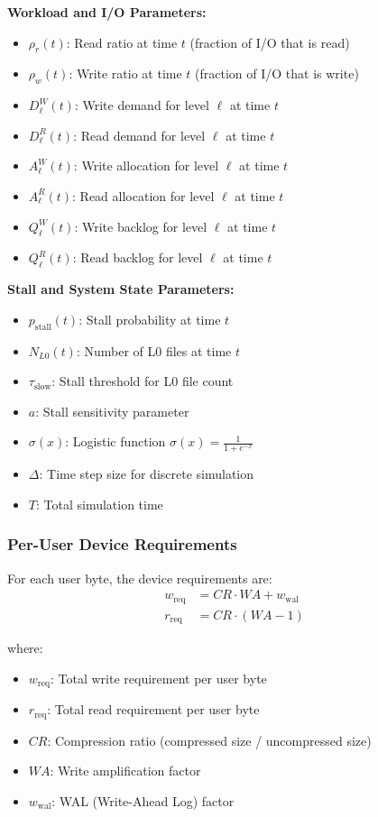 \documentclass[11pt]{article}
\begin{document}
\textbf{Workload and I/O Parameters:}
\begin{itemize}
    \item $\rho_r(t)$: Read ratio at time $t$ (fraction of I/O that is read)
    \item $\rho_w(t)$: Write ratio at time $t$ (fraction of I/O that is write)
    \item $D^W_\ell(t)$: Write demand for level $\ell$ at time $t$
    \item $D^R_\ell(t)$: Read demand for level $\ell$ at time $t$
    \item $A^W_\ell(t)$: Write allocation for level $\ell$ at time $t$
    \item $A^R_\ell(t)$: Read allocation for level $\ell$ at time $t$
    \item $Q^W_\ell(t)$: Write backlog for level $\ell$ at time $t$
    \item $Q^R_\ell(t)$: Read backlog for level $\ell$ at time $t$
\end{itemize}

\textbf{Stall and System State Parameters:}
\begin{itemize}
    \item $p_{\text{stall}}(t)$: Stall probability at time $t$
    \item $N_{L0}(t)$: Number of L0 files at time $t$
    \item $\tau_{\text{slow}}$: Stall threshold for L0 file count
    \item $a$: Stall sensitivity parameter
    \item $\sigma(x)$: Logistic function $\sigma(x) = \frac{1}{1 + e^{-x}}$
    \item $\Delta$: Time step size for discrete simulation
    \item $T$: Total simulation time
\end{itemize}

\subsubsection{Per-User Device Requirements}
For each user byte, the device requirements are:
\begin{align}
w_{\text{req}} &= CR \cdot WA + w_{\text{wal}} \\
r_{\text{req}} &= CR \cdot (WA - 1)
\end{align}

where:
\begin{itemize}
    \item $w_{\text{req}}$: Total write requirement per user byte
    \item $r_{\text{req}}$: Total read requirement per user byte
    \item $CR$: Compression ratio (compressed size / uncompressed size)
    \item $WA$: Write amplification factor
    \item $w_{\text{wal}}$: WAL (Write-Ahead Log) factor
\end{itemize}
\end{document}
